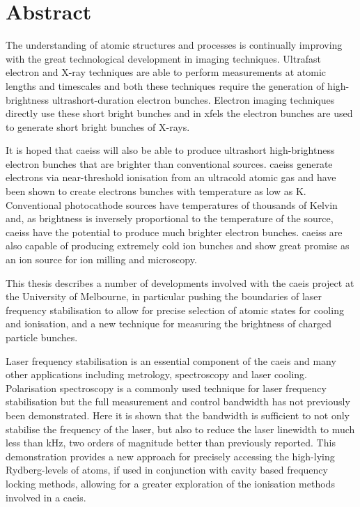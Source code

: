 \chapter*{Abstract}

The understanding of atomic structures and processes is continually improving with the great technological development in imaging techniques.
Ultrafast electron and X-ray techniques are able to perform measurements at atomic lengths and timescales and both these techniques require the generation of high-brightness ultrashort-duration electron bunches.
Electron imaging techniques directly use these short bright bunches and in \glspl{xfel} the electron bunches are used to generate short bright bunches of X-rays.

It is hoped that \glspl{caeis} will also be able to produce ultrashort high-brightness electron bunches that are brighter than conventional sources.
\Glspl{caeis} generate electrons via near-threshold ionisation from an ultracold atomic gas and have been shown to create electrons bunches with temperature as low as \unit[10]{K}.
Conventional photocathode sources have temperatures of thousands of Kelvin and, as brightness is inversely proportional to the temperature of the source, \glspl{caeis} have the potential to produce much brighter electron bunches.
\Glspl{caeis} are also capable of producing extremely cold ion bunches and show great promise as an ion source for ion milling and microscopy.

This thesis describes a number of developments involved with the \gls{caeis} project at the University of Melbourne, in particular pushing the boundaries of laser frequency stabilisation to allow for precise selection of atomic states for cooling and ionisation, and a new technique for measuring the brightness of charged particle bunches.

Laser frequency stabilisation is an essential component of the \gls{caeis} and many other applications including metrology, spectroscopy and laser cooling.
Polarisation spectroscopy is a commonly used technique for laser frequency stabilisation but the full measurement and control bandwidth has not previously been demonstrated.
Here it is shown that the bandwidth is sufficient to not only stabilise the frequency of the laser, but also to reduce the laser linewidth to much less than \unit[1]{kHz}, two orders of magnitude better than previously reported.
This demonstration provides a new approach for precisely accessing the high-lying Rydberg-levels of atoms, if used in conjunction with cavity based frequency locking methods, allowing for a greater exploration of the ionisation methods involved in a \gls{caeis}.

